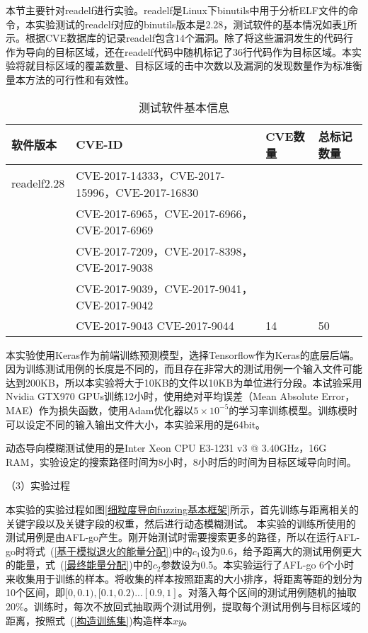 本节主要针对readelf进行实验。readelf是Linux下binutils中用于分析ELF文件的命令，本实验测试的readelf对应的binutils版本是2.28，测试软件的基本情况如表\ref{测试软件基本信息}所示。根据CVE数据库的记录readelf包含14个漏洞。除了将这些漏洞发生的代码行作为导向的目标区域，还在readelf代码中随机标记了36行代码作为目标区域。本实验将就目标区域的覆盖数量、目标区域的击中次数以及漏洞的发现数量作为标准衡量本方法的可行性和有效性。

\begin{table}[ht]
\begin{center}
\caption{测试软件基本信息}
\label{测试软件基本信息}
\begin{small}
\begin{tabular}{|l|l|l|l|}
\hline
{\bf 软件版本} & {\bf CVE-ID} & {\bf CVE数量} & {\bf 总标记数量} \\
\hline
readelf2.28 & CVE-2017-14333，CVE-2017-15996，CVE-2017-16830 & &\\
& CVE-2017-6965，CVE-2017-6966，CVE-2017-6969 & & \\
& CVE-2017-7209，CVE-2017-8398，CVE-2017-9038 & & \\
& CVE-2017-9039，CVE-2017-9041，CVE-2017-9042 & & \\
& CVE-2017-9043 CVE-2017-9044 & 14 & 50\\
\hline
\end{tabular}
\end{small}
\end{center}
\end{table}

本实验使用Keras作为前端训练预测模型，选择Tensorflow作为Keras的底层后端。因为训练测试用例的长度是不同的，而且存在非常大的测试用例一个输入文件可能达到200KB，所以本实验将大于10KB的文件以10KB为单位进行分段。本试验采用Nvidia GTX970 GPUs训练12小时，使用绝对平均误差（Mean Absolute Error，MAE）作为损失函数，使用Adam优化器以$5 \times 10^{-5}$的学习率训练模型。训练模时可以设定不同的输入输出文件大小，本实验采用的是64bit。

动态导向模糊测试使用的是Inter Xeon CPU E3-1231 v3 @ 3.40GHz，16G RAM，实验设定的搜索路径时间为8小时，8小时后的时间为目标区域导向时间。

（3）实验过程

本实验的实验过程如图\ref{细粒度导向fuzzing基本框架}所示，首先训练与距离相关的关键字段以及关键字段的权重，然后进行动态模糊测试。
本实验的训练所使用的测试用例是由AFL-go产生。刚开始测试时需要搜索更多的路径，所以在运行AFL-go时将式~(\ref{基于模拟退火的能量分配})中的$c_1$设为0.6，给予距离大的测试用例更大的能量，式~(\ref{最终能量分配})中的$c_2$参数设为0.5。本实验运行了AFL-go 6个小时来收集用于训练的样本。将收集的样本按照距离的大小排序，将距离等距的划分为10个区间，即$[0,0.1),[0.1,0.2)...[0.9,1]$。对落入每个区间的测试用例随机的抽取20\%。训练时，每次不放回式抽取两个测试用例，提取每个测试用例与目标区域的距离，按照式~(\ref{构造训练集})构造样本$xy$。


